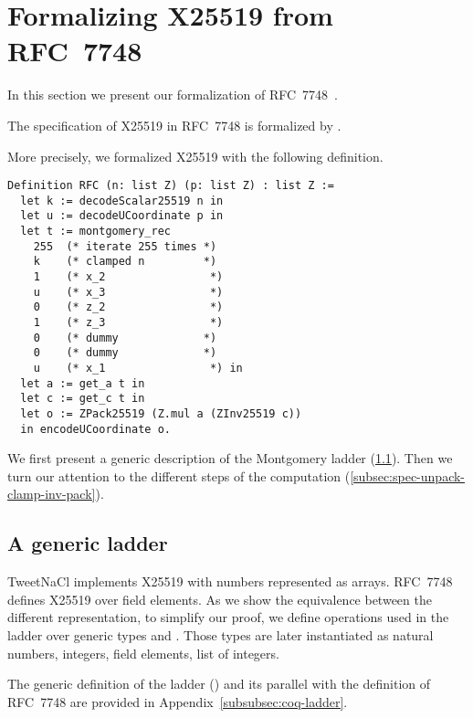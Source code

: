 \section{Formalizing X25519 from RFC~7748}
\label{sec:Coq-RFC}

In this section we present our formalization of RFC~7748~\cite{rfc7748}.

\begin{informaltheorem}
The specification of X25519 in RFC~7748 is formalized by .
\end{informaltheorem}

More precisely, we formalized X25519 with the following definition.
\begin{lstlisting}[language=Coq]
Definition RFC (n: list Z) (p: list Z) : list Z :=
  let k := decodeScalar25519 n in
  let u := decodeUCoordinate p in
  let t := montgomery_rec
    255  (* iterate 255 times *)
    k    (* clamped n         *)
    1    (* x_2                *)
    u    (* x_3                *)
    0    (* z_2                *)
    1    (* z_3                *)
    0    (* dummy             *)
    0    (* dummy             *)
    u    (* x_1                *) in
  let a := get_a t in
  let c := get_c t in
  let o := ZPack25519 (Z.mul a (ZInv25519 c))
  in encodeUCoordinate o.
\end{lstlisting}

We first present a generic description of the Montgomery ladder (\ref{subsec:spec-ladder}).
Then we turn our attention to the different steps of the computation (\ref{subsec:spec-unpack-clamp-inv-pack}).



\subsection{A generic ladder}
\label{subsec:spec-ladder}


TweetNaCl implements X25519 with numbers represented as arrays.
RFC~7748 defines X25519 over field elements. As we show the equivalence between
the different representation, to simplify our proof, we define operations used
in the ladder over generic types  and .
Those types are later instantiated as natural numbers, integers, field elements,
list of integers.

The generic definition of the ladder () and its parallel with
the definition of RFC~7748 are provided in Appendix~\ref{subsubsec:coq-ladder}.

